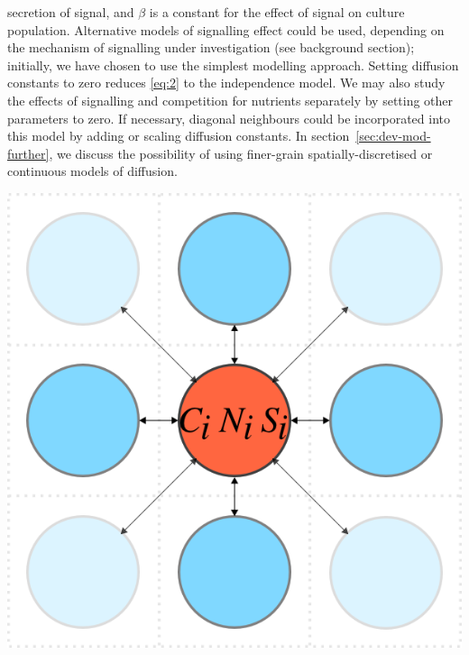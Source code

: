 secretion of signal, and \(\beta\) is a constant for the effect of
signal on culture population. Alternative models of signalling effect
could be used, depending on the mechanism of signalling under
investigation (see background section); initially, we have chosen to
use the simplest modelling approach. Setting diffusion constants to
zero reduces \ref{eq:2} to the independence model. We may also study
the effects of signalling and competition for nutrients separately by
setting other parameters to zero. If necessary, diagonal neighbours
could be incorporated into this model by adding or scaling diffusion
constants. In section~\ref{sec:dev-mod-further}, we discuss the
possibility of using finer-grain spatially-discretised or continuous
models of diffusion.

\begin{Figure}
  \centering
  \includegraphics[width=\linewidth]{square_array}
  \label{fig:simple_model}
\end{Figure}


